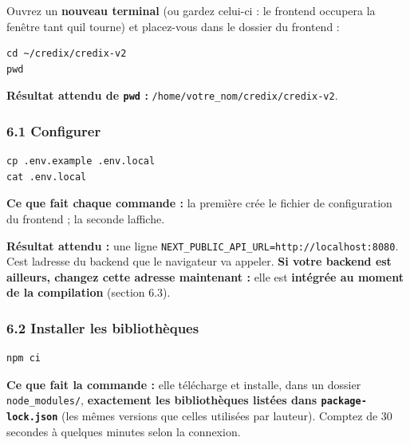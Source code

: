 \documentclass[
  french,
  11pt,
  a4paper,
]{article}
\begin{document}
Ouvrez un \textbf{nouveau terminal} (ou gardez celui-ci : le frontend
occupera la fenêtre tant qu\textquotesingle il tourne) et placez-vous
dans le dossier du frontend :

\begin{Verbatim}[breaklines=true,breakanywhere=true,fontsize=\small,frame=leftline,framerule=1.6pt,rulecolor=\color{credixblue},framesep=3mm,xleftmargin=2mm,xrightmargin=1mm]
cd ~/credix/credix-v2
pwd
\end{Verbatim}

\textbf{Résultat attendu de \texttt{pwd} :}
\texttt{/\allowbreak{}home/\allowbreak{}votre\_\allowbreak{}nom/\allowbreak{}credix/\allowbreak{}credix-\allowbreak{}v2}.

\subsubsection{6.1 Configurer}\label{61-configurer}

\begin{Verbatim}[breaklines=true,breakanywhere=true,fontsize=\small,frame=leftline,framerule=1.6pt,rulecolor=\color{credixblue},framesep=3mm,xleftmargin=2mm,xrightmargin=1mm]
cp .env.example .env.local
cat .env.local
\end{Verbatim}

\textbf{Ce que fait chaque commande :} la première crée le fichier de
configuration du frontend ; la seconde l\textquotesingle affiche.

\textbf{Résultat attendu :} une ligne
\texttt{NEXT\_\allowbreak{}PUBLIC\_\allowbreak{}API\_\allowbreak{}URL=\allowbreak{}http:/\allowbreak{}/\allowbreak{}localhost:8080}.
C\textquotesingle est l\textquotesingle adresse du backend que le
navigateur va appeler. \textbf{Si votre backend est ailleurs, changez
cette adresse maintenant :} elle est \textbf{intégrée au moment de la
compilation} (section 6.3).

\subsubsection{6.2 Installer les
bibliothèques}\label{62-installer-les-bibliothuxe8ques}

\begin{Verbatim}[breaklines=true,breakanywhere=true,fontsize=\small,frame=leftline,framerule=1.6pt,rulecolor=\color{credixblue},framesep=3mm,xleftmargin=2mm,xrightmargin=1mm]
npm ci
\end{Verbatim}

\textbf{Ce que fait la commande :} elle télécharge et installe, dans un
dossier \texttt{node\_modules/}, \textbf{exactement les bibliothèques
listées dans \texttt{package-\allowbreak{}lock.\allowbreak{}json}} (les
mêmes versions que celles utilisées par l\textquotesingle auteur).
Comptez de 30 secondes à quelques minutes selon la connexion.
\end{document}
